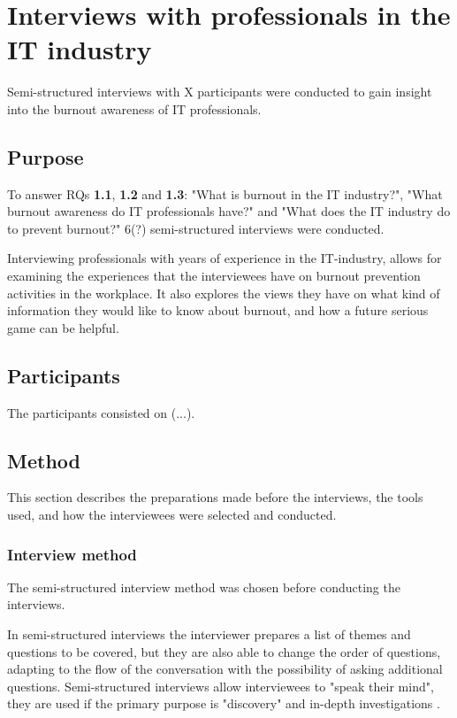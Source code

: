 \chapter{Interviews with professionals in the IT industry}

Semi-structured interviews with X participants were conducted to gain insight into the burnout awareness of IT professionals.

\section{Purpose}
To answer RQs \textbf{1.1}, \textbf{1.2} and \textbf{1.3}: "What is burnout in the IT industry?", "What burnout awareness do IT professionals have?" and "What does the IT industry do to prevent burnout?" 6(?) semi-structured interviews were conducted. 

Interviewing professionals with years of experience in the IT-industry, allows for examining the experiences that the interviewees have on burnout prevention activities in the workplace. It also explores the views they have on what kind of information they would like to know about burnout, and how a future serious game can be helpful.

\section{Participants}

The participants consisted on (...). 

\section{Method}
This section describes the preparations made before the interviews, the tools used, and how the interviewees were selected and conducted.

\subsection{Interview method}
The semi-structured interview method was chosen before conducting the interviews. 

In semi-structured interviews the interviewer prepares a list of themes and questions to be covered, but they are also able to change the order of questions, adapting to the flow of the conversation with the possibility of asking additional questions. Semi-structured interviews  allow interviewees to "speak their mind", they are used if the primary purpose is "discovery" and in-depth investigations \parencite[188]{oates_researching_2006}. 

